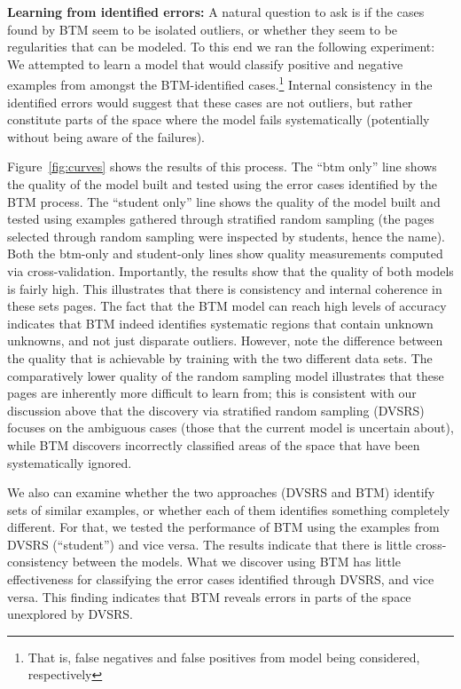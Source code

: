 \textbf{Learning from identified errors:}  A natural question to ask is if the cases found by BTM seem to be isolated outliers, or whether they seem to be regularities that can be modeled. To this end we ran the following experiment: We attempted to learn a model that would classify positive and negative examples from amongst the BTM-identified cases.\footnote{That is, false negatives and false positives from model being considered, respectively } Internal consistency in the identified errors would suggest that these cases are not outliers, but rather constitute parts of the space where the model fails systematically (potentially without being aware of the failures).


Figure~\ref{fig:curves} shows the results of this process. The ``btm
only'' line shows the quality of the model built and tested using the
error cases identified by the BTM process.  The ``student only'' line
shows the quality of the model built and tested using examples
gathered through stratified random sampling (the pages selected
through random sampling were inspected by students, hence the
name). Both the btm-only and student-only lines show quality
measurements computed via cross-validation.  
Importantly, the results show that the
quality of both models is fairly high.  This illustrates that there is
consistency and internal coherence in these sets pages.  The fact that
the BTM model can reach high levels of accuracy indicates that BTM
indeed identifies systematic regions that contain unknown unknowns, and not just disparate outliers. 
However, note the difference between the quality that is achievable by training with the two different data sets.  
The comparatively lower quality of the random sampling model
illustrates that these pages are inherently more difficult to learn
from; this is consistent with our discussion above that the discovery
via stratified random sampling (DVSRS) focuses on the ambiguous cases
(those that the current model is uncertain about), while BTM discovers
incorrectly classified areas of the space that have been
systematically ignored.

We also can examine whether the two approaches (DVSRS and BTM) identify sets of similar examples, or whether each of them identifies something completely different. For that, we tested the performance of BTM using the examples from DVSRS (``student'') and vice versa. The results indicate that there is little cross-consistency between the models. What we discover using BTM has little effectiveness for classifying the error cases identified through DVSRS, and vice versa. This finding indicates  that BTM reveals errors in parts of the space unexplored by DVSRS.

